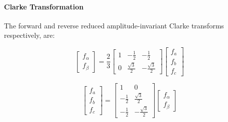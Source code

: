 \documentclass{article}
\begin{document}
\begin{center}
\end{center}


\paragraph{Clarke Transformation}


The forward and reverse reduced amplitude-invariant Clarke transforms respectively, are: 

\begin{equation}
    \begin{bmatrix}
        f_\alpha \\
        f_\beta
    \end{bmatrix}
    =
    \frac{2}{3}
    \begin{bmatrix}
        1 & -\frac{1}{2} & -\frac{1}{2} \\
        0 & \frac{\sqrt{3}}{2} & -\frac{\sqrt{3}}{2}
    \end{bmatrix}
    \begin{bmatrix}
        f_a \\
        f_b \\
        f_c
    \end{bmatrix}
\end{equation}

\begin{equation}
    \begin{bmatrix}
        f_a \\
        f_b \\
        f_c
    \end{bmatrix}
    =
    \begin{bmatrix}
        1 & 0 \\
        -\frac{1}{2} & \frac{\sqrt{3}}{2} \\
        -\frac{1}{2} & -\frac{\sqrt{3}}{2}
    \end{bmatrix}
    \begin{bmatrix}
        f_\alpha \\
        f_\beta
    \end{bmatrix}
\end{equation}
\end{document}
